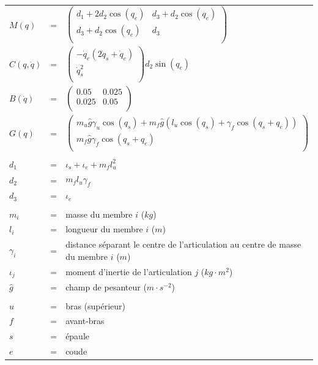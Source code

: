 \documentclass[pdftex,a4paper,11pt]{article}
\numberwithin{equation}{subsection}
\begin{document}
\paragraph{}
\begin{tabular}{lcl}
    $M(q)$ & = &
    $
    \begin{pmatrix}
        d_1 + 2 d_2 \cos(q_e)  & d_3 + d_2 \cos(q_e) \\
        d_3 + d_2 \cos(q_e) & d_3 \\
    \end{pmatrix}
    $ \\

    $C(q, \dot{q})$ & = &
    $
    \begin{pmatrix}
        -\dot{q}_e (2 \dot{q}_s + \dot{q}_e) \\
        \dot{q}_s^2 \\
    \end{pmatrix}
    d_2 \sin(q_e)
    $\\

    $B(\dot{q})$ & = &
    $
    \begin{pmatrix}
        0.05  & 0.025 \\
        0.025 & 0.05 \\
    \end{pmatrix}
    $\\

    $G(q)$ & = &
    $
    \begin{pmatrix}
        m_u \hat{g}  \gamma_u \cos(q_s) + m_f \hat{g} (l_u \cos(q_s) + \gamma_f \cos(q_s + q_e)) \\
        m_f \hat{g}  \gamma_f \cos(q_s + q_e) \\
    \end{pmatrix}
    $ \\

    \\
    $d_1$ & = & $\iota_s + \iota_e + m_f l_u^2$ \\
    $d_2$ & = & $m_f l_u \gamma_f$ \\
    $d_3$ & = & $\iota_e$ \\
    \\
    $m_i$ & = & masse du membre $i$ ($kg$) \\
    $l_i$ & = & longueur du membre $i$ ($m$) \\
    $\gamma_i$ & = & distance séparant le centre de l'articulation au centre de masse du membre $i$ ($m$) \\
    $\iota_j$ & = & moment d'inertie de l'articulation $j$ ($kg \cdot m^2$) \\
    $\hat{g}$ & = & champ de pesanteur ($m \cdot s^{-2}$) \\
    \\

    $u$ & = & bras (supérieur)\\
    $f$ & = & avant-bras\\

    $s$ & = & épaule\\
    $e$ & = & coude\\
\end{tabular}
\end{document}
